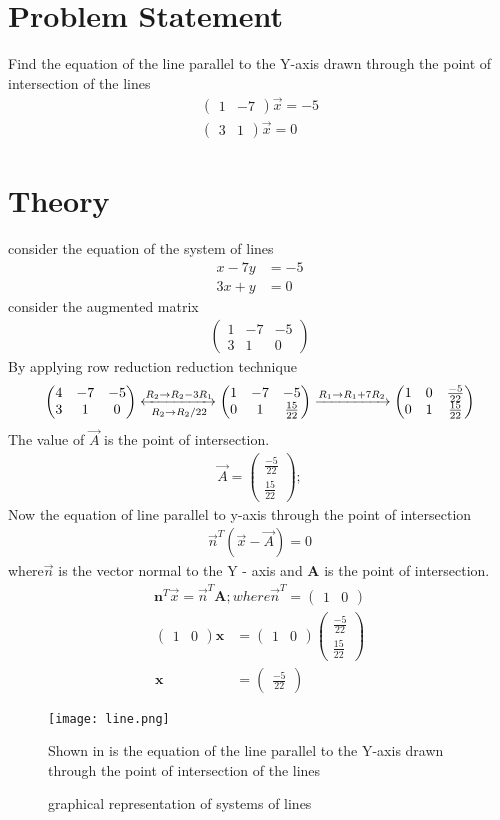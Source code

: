 \documentclass{article}
\renewcommand{\vec}[1]{\mathbf{#1}}
\newcommand{\myvec}[1]{\ensuremath{\begin{pmatrix}#1\end{pmatrix}}}
\begin{document}
\section{Problem Statement}
Find the equation of the line parallel to the Y-axis drawn through the point of intersection of the lines
\begin{align}
\myvec{1 & -7}\Vec{x}  =-5 \\ \myvec{3 & 1}\Vec{x}= 0
\end{align}
\section{Theory}
consider the equation of the system of lines
\begin{align}
x - 7y & = -5 \\
3x + y & = 0
\end{align}
 consider the augmented matrix
 \begin{align}
 \myvec{1 & -7 & -5 \\ 3 & 1 & 0}
 \end{align}
 By applying row reduction reduction technique 
 \begin{align}
\myvec{4 & -7 & -5\\ 3 & 1 & 0}
	\xleftrightarrow[R_2 \rightarrow R_2/22]{R_2 \rightarrow R_2-3R_1}
	\myvec{1 & -7 & -5 \\ 0 & 1 & \frac{15}{22}}
	\xrightarrow[]{R_1 \rightarrow R_1+7R_2}
	 \myvec{1 & 0 & \frac{-5}{22} \\ 0 & 1 & \frac{15}{22}}
 \end{align}
 The value of $\Vec{A}$ is the point of intersection.
\begin{align}
 {\Vec{A}} = \myvec{\frac{-5}{22} \\ \frac{15}{22}} ;
\end{align}
Now the equation of line parallel to y-axis through the point of intersection
\begin{align}
\Vec{n}^T(\Vec{x}-\Vec{A}) = 0
\end{align}
where$\Vec{n}$ is the vector normal to the Y - axis and $\vec{A}$ is the point of intersection.\\
\begin{align*}
\vec{n}^T \Vec{x} = \Vec{n}^T\vec{A} ; where
 \Vec{n}^T = \myvec{1 & 0}
 \end{align*}
 \begin{align}
\myvec{1 & 0}\vec{x} &  = \myvec{1 & 0} \myvec{\frac{-5}{22} \\ \frac{15}{22}}\\
\vec{x} & = \myvec{\frac{-5}{22}} 
 \end{align}
 \begin{figure}
 \centering
 \texttt{[image: line.png]}
 \caption{graphical representation of systems of lines}
 \label{fig:lines}
 Shown in  is the equation of the line parallel to the Y-axis drawn through the point of intersection of the lines 
 \end{figure}
\end{document}
